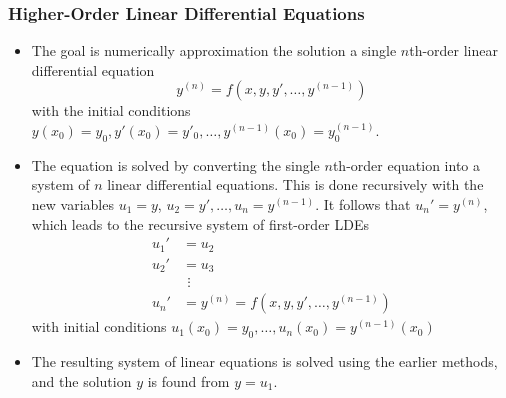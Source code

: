 \documentclass[11pt, a4paper]{article}
\begin{document}
\subsubsection{Higher-Order Linear Differential Equations}
\begin{itemize}
	\item The goal is numerically approximation the solution a single $ n $th-order linear differential equation
	\begin{equation*}
		y^{(n)} = f(x, y, y', \dots, y^{(n-1)})
	\end{equation*}
	with the initial conditions $ y(x_{0}) = y_{0}, y'(x_{0}) = y'_{0}, \ldots, y^{(n-1)}(x_{0}) = y^{(n-1)}_{0} $.
	
	\item The equation is solved by converting the single $ n $th-order equation into a system of $ n $ linear differential equations. This is done recursively with the new variables $ u_{1} = y $, $ u_{2} = y', \ldots, u_{n} = y^{(n-1)} $. It follows that $ u_{n}' = y^{(n)} $, which leads to the recursive system of first-order LDEs
	\begin{align*}
		u_{1}' &= u_{2} \\
		u_{2}' &= u_{3}\\[-3mm]
		& \ \, \vdots\\[-2.5mm]
		u_{n}' &= y^{(n)} = f(x, y, y', \dots, y^{(n-1)})
	\end{align*}
	with initial conditions $ u_{1}(x_{0}) = y_{0}, \ldots, u_{n}(x_{0}) = y^{(n-1)}(x_{0}) $
	
	\item The resulting system of linear equations is solved using the earlier methods, and the solution $ y $ is found from $ y = u_{1} $.
\end{itemize}
\end{document}

